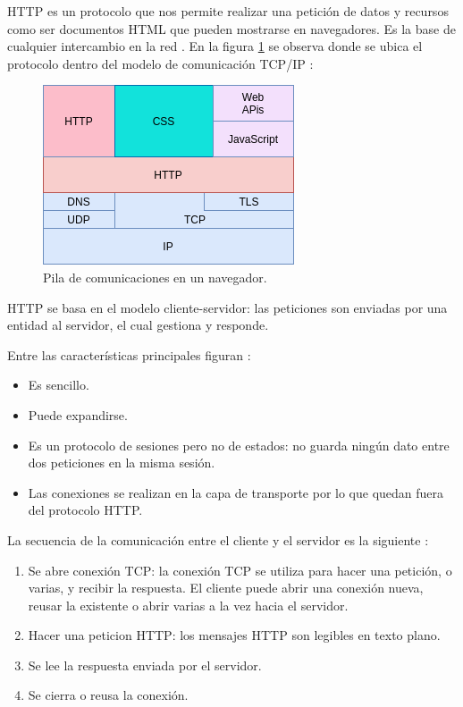 HTTP es un protocolo que nos permite realizar una petición de datos y recursos como ser documentos HTML que pueden mostrarse en navegadores. Es la base de cualquier intercambio en la red \citep{WEBSITE:19}. En la figura \ref{fig:Protocolo HTTP } se observa donde se ubica el protocolo dentro del modelo de comunicación TCP/IP :


\begin{figure}[ht]
	\centering
	\includegraphics[scale=.5]{./Figures/http.png}
	\caption{Pila de comunicaciones en un navegador.}
	\label{fig:Protocolo HTTP }
\end{figure}

HTTP se basa en el modelo cliente-servidor: las peticiones son enviadas por una entidad al servidor, el cual gestiona y responde.

Entre las características principales figuran \citep{WEBSITE:19}:
\begin{itemize}
\item Es sencillo.
\item Puede expandirse.
\item Es un protocolo de sesiones pero no de estados: no guarda ningún dato entre dos peticiones en la misma sesión.
\item Las conexiones se realizan en la capa de transporte por lo que quedan fuera del protocolo HTTP.
\end{itemize}

La secuencia de la comunicación entre el cliente y el servidor es la siguiente \citep{WEBSITE:19}:
\begin{enumerate}
\item Se abre conexión TCP: la conexión TCP se utiliza para hacer una petición, o varias, y recibir la respuesta. El cliente puede abrir una conexión nueva, reusar la existente o abrir varias a la vez hacia el servidor.
\item Hacer una peticion HTTP: los mensajes HTTP son legibles en texto plano.
\item Se lee la respuesta enviada por el servidor.
\item Se cierra o reusa la conexión.
\end{enumerate}


